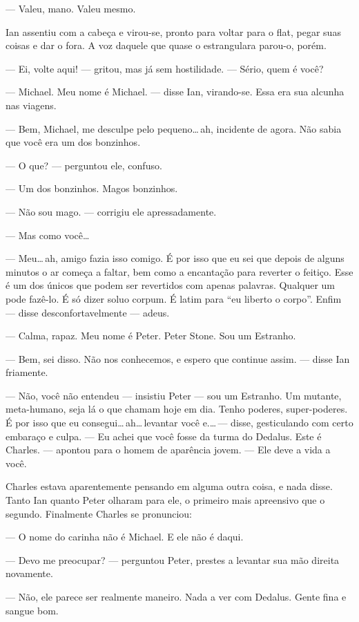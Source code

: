 --- Valeu, mano. Valeu mesmo.

Ian assentiu com a cabeça e virou-se, pronto para voltar para o flat,
pegar suas coisas e dar o fora. A voz daquele que quase o estrangulara
parou-o, porém.

--- Ei, volte aqui! --- gritou, mas já sem hostilidade. --- Sério, quem
é você?

--- Michael. Meu nome é Michael. --- disse Ian, virando-se. Essa era sua
alcunha nas viagens.

--- Bem, Michael, me desculpe pelo pequeno\ldots\,ah, incidente de
agora. Não sabia que você era um dos bonzinhos.

--- O que? --- perguntou ele, confuso.

--- Um dos bonzinhos. Magos bonzinhos.

--- Não sou mago. --- corrigiu ele apressadamente.

--- Mas como você\ldots

--- Meu\ldots\,ah, amigo fazia isso comigo. É por isso que eu sei que
depois de alguns minutos o ar começa a faltar, bem como a encantação
para reverter o feitiço. Esse é um dos únicos que podem ser revertidos
com apenas palavras. Qualquer um pode fazê-lo. É só dizer soluo corpum.
É latim para “eu liberto o corpo”. Enfim --- disse desconfortavelmente
--- adeus.

--- Calma, rapaz. Meu nome é Peter. Peter Stone. Sou um Estranho.

--- Bem, sei disso. Não nos conhecemos, e espero que continue assim. ---
disse Ian friamente.

--- Não, você não entendeu --- insistiu Peter --- sou um Estranho. Um
mutante, meta-humano, seja lá o que chamam hoje em dia. Tenho poderes,
super-poderes. É por isso que eu consegui\ldots\,ah\ldots\,levantar você
e.\ldots\,--- disse, gesticulando com certo embaraço e culpa. --- Eu
achei que você fosse da turma do Dedalus. Este é Charles. --- apontou
para o homem de aparência jovem. --- Ele deve a vida a você.

Charles estava aparentemente pensando em alguma outra coisa, e nada
disse. Tanto Ian quanto Peter olharam para ele, o primeiro mais
apreensivo que o segundo. Finalmente Charles se pronunciou:

--- O nome do carinha não é Michael. E ele não é daqui.

--- Devo me preocupar? --- perguntou Peter, prestes a levantar sua mão
direita novamente.

--- Não, ele parece ser realmente maneiro. Nada a ver com Dedalus. Gente
fina e sangue bom.

